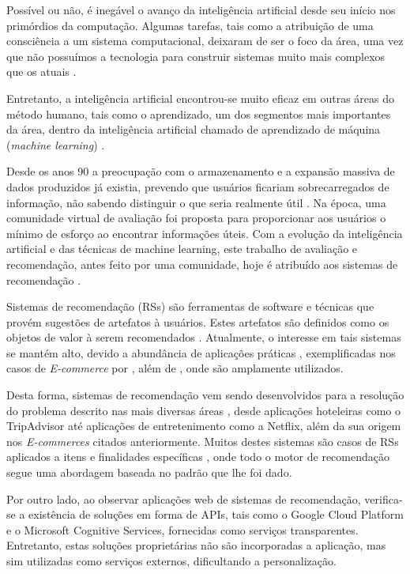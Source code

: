 \documentclass[12pt, openright, oneside, a4paper, brazil]{abntex2}
\begin{document}
Possível ou não, é inegável o avanço da inteligência artificial desde seu início nos primórdios da computação. Algumas tarefas, tais como a atribuição de uma consciência a um sistema computacional, deixaram de ser o foco da área, uma vez que não possuímos a tecnologia para construir sistemas muito mais complexos que os atuais  \cite{russell2004inteligencia}.

Entretanto, a inteligência artificial encontrou-se muito eficaz em outras áreas do método humano, tais como o aprendizado, um dos segmentos mais importantes da área, dentro da inteligência artificial chamado de aprendizado de máquina (\textit{machine learning}) \cite{coppin2015inteligencia}.

Desde os anos 90 a preocupação com o armazenamento e a expansão massiva de dados produzidos já existia, prevendo que usuários ficariam sobrecarregados de informação, não sabendo distinguir o que seria realmente útil \cite{hill1995recommending, adomavicius2005toward}. Na época, uma comunidade virtual de avaliação foi proposta para proporcionar aos usuários o mínimo de esforço ao encontrar informações úteis. Com a evolução da inteligência artificial e das técnicas de machine learning, este trabalho de avaliação e recomendação, antes feito por uma comunidade, hoje é atribuído aos sistemas de recomendação \cite{hill1995recommending}.

Sistemas de recomendação (RSs) são ferramentas de  software e técnicas que provém sugestões de artefatos à usuários. Estes artefatos são definidos como os objetos de valor à serem recomendados \cite{ricci2011introduction}. Atualmente, o interesse em tais sistemas se mantém alto, devido a abundância de aplicações práticas \cite{adomavicius2005toward}, exemplificadas nos casos de \textit{E-commerce} por , além de , onde são amplamente utilizados.

Desta forma, sistemas de recomendação vem sendo desenvolvidos para a resolução do problema descrito nas mais diversas áreas \cite{bennett2007netflix, gavalas2014mobile}, desde aplicações hoteleiras como o TripAdvisor até aplicações de entretenimento como a Netflix, além da sua origem nos \textit{E-commerces} citados anteriormente. Muitos destes sistemas são casos de RSs aplicados a itens e finalidades específicas \cite{huang2002graph, brozovsky2007recommender}, onde todo o motor de recomendação segue uma abordagem baseada no padrão que lhe foi dado.

Por outro lado, ao observar aplicações web de sistemas de recomendação, verifica-se a existência de soluções em forma de APIs, tais como o Google Cloud Platform e o Microsoft Cognitive Services, fornecidas como serviços transparentes. Entretanto, estas soluções proprietárias não são incorporadas a aplicação, mas sim utilizadas como serviços externos, dificultando a personalização.
\end{document}
